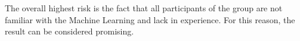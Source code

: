 The overall highest risk is the fact that all participants of the group are not familiar with the Machine Learning and lack in 
experience. For this reason, the result can be considered promising. 

%
%
%
%
%
%
